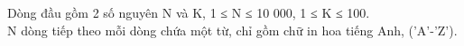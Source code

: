 Dòng đầu gồm 2 số nguyên N và K, 1 ≤ N ≤ 10 000, 1 ≤ K ≤ 100.   
\\   N dòng tiếp theo mỗi dòng chứa một từ, chỉ gồm chữ in hoa tiếng Anh, ('A'-'Z').  

\